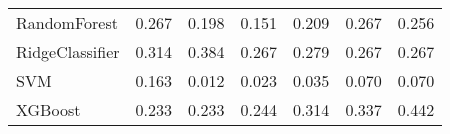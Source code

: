 \begin{tabular}{lllllll}
                   RandomForest & 0.267 &                     0.198 &                 0.151 &                  0.209 &                                   0.267 &     0.256 \\
                RidgeClassifier & 0.314 &                     0.384 &                 0.267 &                  0.279 &                                   0.267 &     0.267 \\
                            SVM & 0.163 &                     0.012 &                 0.023 &                  0.035 &                                   0.070 &     0.070 \\
                        XGBoost & 0.233 &                     0.233 &                 0.244 &                  0.314 &                                   0.337 &     0.442 \\
\bottomrule
\end{tabular}
